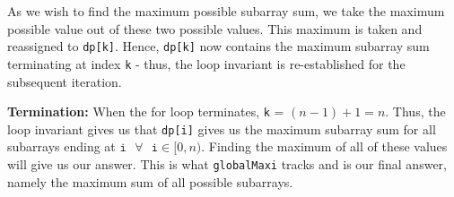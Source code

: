 \noindent As we wish to find the maximum possible subarray sum, we take the maximum possible value out of these two possible values. This maximum is taken and reassigned to \texttt{dp[k]}. Hence, \texttt{dp[k]} now contains the maximum subarray sum terminating at index \texttt{k} - thus, the loop invariant is re-established for the subsequent iteration. 
\newline

\noindent \textbf{Termination:} When the for loop terminates, \texttt{k} = $(n-1)+1 = n$. Thus, the loop invariant gives us that \texttt{dp[i]} gives us the maximum subarray sum for all subarrays ending at $\texttt{i} \text{  } \forall \text{  } \texttt{i} \in [0, n)$. Finding the maximum of all of these values will give us our answer. This is what \texttt{globalMaxi} tracks and is our final answer, namely the maximum sum of all possible subarrays.
